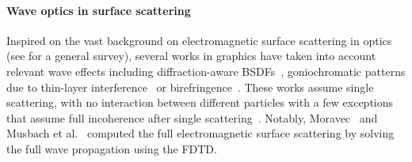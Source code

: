 \paragraph{Wave optics in surface scattering} 
Inspired on the vast background on electromagnetic surface scattering in optics (see \cite{frisvad2020survey} for a general survey), several works in graphics have taken into account relevant wave effects including diffraction-aware BSDFs~\cite{he1991comprehensive,Stam:1999:DiffractionShaders,Cuypers:2012:Diffraction,dong2015predicting,Holzschuch:2017:Two, Toisoul:2017:practical, Werner:2017:ScratchIridescence,Yan:2018:WavesMicrogeometry},  goniochromatic patterns due to thin-layer interference~\cite{Smits:1992:Newton,Gondek:1994:WavelengthDependent,Belcour:2017:Iridescence,guillen2020general} or birefringence~\cite{Steinberg:2019:Analytic}. These works assume single scattering, with no interaction between different particles with a few exceptions that assume full incoherence after single scattering~\cite{Falster:2020:Computing,guillen2020general}. Notably, Moravec~ and Musbach et al.~ computed the full electromagnetic surface scattering by solving the full wave propagation using the FDTD. 
%
